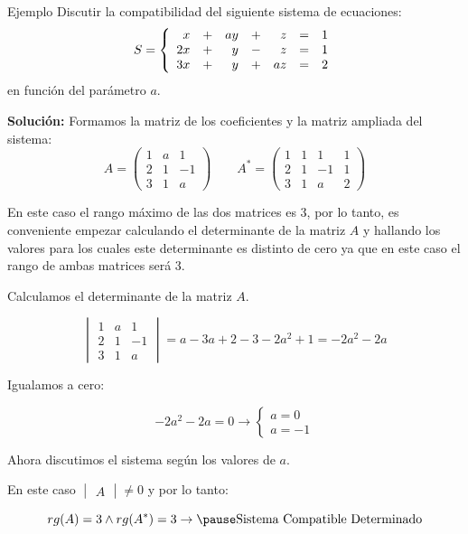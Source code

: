 \documentclass[9pt]{beamer}
\newenvironment{sistematres}{\left\lbrace \begin{array}{rrrrrrr}}{\end{array} \right.}
\begin{document}
\begin{frame}
\begin{exampleblock}{Ejemplo}
Discutir la compatibilidad del siguiente sistema de ecuaciones:
\[
S=\begin{sistematres}
	x & + & ay & + & z & = & 1 \\
	2x & + & y & - & z & = & 1 \\
	3x & + & y & + & az & = & 2 
\end{sistematres}
\]
en función del parámetro $a$.
\end{exampleblock}

\pause
\textbf{Solución:}
Formamos la matriz de los coeficientes y la matriz ampliada del sistema:
\[
A=\begin{pmatrix}
	1 & a & 1 \\
	2 & 1 & -1 \\
	3 & 1 & a
\end{pmatrix}
\qquad
A^{*}=\begin{pmatrix}
	1 & 1 & 1 & 1 \\
	2 & 1 & -1 & 1 \\
	3 & 1 & a & 2
\end{pmatrix} 
\]

En este caso el rango máximo de las dos matrices es 3, por lo tanto, es conveniente empezar calculando el determinante de la matriz $A$ y hallando los valores para los cuales este determinante es distinto de cero ya que en este caso el rango de ambas matrices será 3.
\end{frame}
\begin{frame}

Calculamos el determinante de la matriz $A$. 

\[ \begin{vmatrix}
	1 & a & 1 \\
	2 & 1 & -1 \\
	3 & 1 & a
\end{vmatrix}= a-3a+2-3-2a^2+1=-2a^2-2a
\]


\pause
Igualamos a cero:

\[ -2a^2-2a=0 \rightarrow \left\lbrace \begin{array}{l} a=0 \\ a=-1 \end{array} \right. \]
\pause

Ahora discutimos el sistema según los valores de $a$.

\end{frame}

\begin{frame}


\pause

En este caso $\begin{vmatrix}
A
\end{vmatrix} \neq 0 $ y por lo tanto:

\pause
\[ rg(A)=3 \wedge rg(A^*)=3 \rightarrow \pause \text{Sistema Compatible Determinado} \]
\end{frame}
\end{document}
